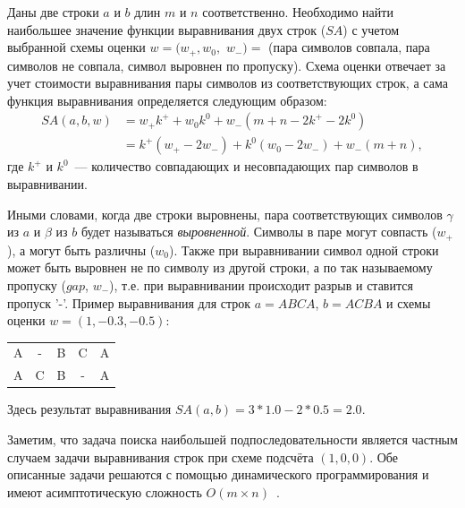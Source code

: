 \begin{definition}
Даны две строки $a$ и $b$ длин $m$ и $n$ соответственно.
Необходимо найти наибольшее  значение функции выравнивания двух строк ($SA$) с учетом выбранной схемы оценки $w = (w_{+}, w_{0} ,$ $w_{-})=$ (пара символов совпала, пара символов не совпала, символ выровнен по пропуску).
Схема оценки отвечает за учет стоимости выравнивания пары символов из соответствующих строк, а сама функция выравнивания определяется следующим образом:
\begin{equation}\label{formula:sa}
\begin{array}{ll}
  SA(a,b,w) &= w_{+}k^{+} + w_{0}k^{0} + w_{-} (m + n - 2k^{+} - 2k^{0}) \\
  &= k^{+} (w_{+} - 2w_{-} ) + k^{0}  (w_{0} - 2w_{-}) + w_{-}(m + n),
\end{array}
\end{equation}
где $k^{+}$ и $k^{0}$~--- количество совпадающих и несовпадающих пар символов в выравнивании.
\end{definition}

Иными словами, когда две строки выровнены, пара соответствующих символов $\gamma$ из $a$ и $\beta$ из $b$ будет называться \emph{выровненной}.
Символы в паре могут совпасть ($w_{+}$), а могут быть различны ($w_{0}$).
Также при выравнивании символ одной строки может  быть выровнен не по символу из другой строки, а по так называемому пропуску ($gap$, $w_{-}$), т.е. при выравнивании происходит разрыв и ставится пропуск '-'.
Пример выравнивания для строк $a=ABCA$, $b=ACBA$ и схемы оценки $w = (1, -0.3, -0.5)$:
\begin{center}
    \begin{tabular}{ccccc}
    A & - & B &  C  &  A \\
    A & C & B &  - &  A
    \end{tabular}
\end{center}
Здесь результат выравнивания $SA(a,b) = 3*1.0-2*0.5 = 2.0$.

Заметим, что задача поиска наибольшей подпоследовательности является частным случаем задачи выравнивания строк при схеме подсчёта $(1,0,0)$.
Обе описанные задачи решаются с помощью динамического программирования и имеют асимптотическую сложность $O(m \times n)$~\cite{huang1994global}.

